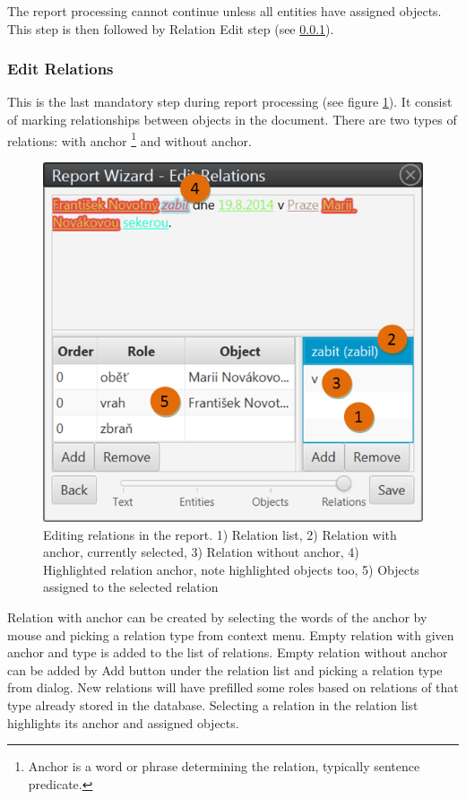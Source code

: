 \documentclass[12pt,a4paper]{report}
\begin{document}
The report processing cannot continue unless all entities have assigned
objects. This step is then followed by Relation Edit step (see
\ref{sssec:EditRelations}).

\subsubsection{Edit Relations}
\label{sssec:EditRelations}

This is the last mandatory step during report processing (see figure
\ref{fig:Relations}). It consist of marking relationships between objects in
the document. There are two types of relations: with anchor%
\footnote{Anchor is a word or phrase determining the relation, typically
sentence predicate.}
and without anchor.

\begin{figure}[!htb]
        \centering
        \includegraphics[width=\textwidth]{Images/relations}
        \caption{Editing relations in the report. 1) Relation list, 2) Relation
		 with anchor, currently selected, 3) Relation without anchor, 4) Highlighted
		 relation anchor, note highlighted objects too, 5) Objects assigned to
		 the selected relation}
        \label{fig:Relations}
\end{figure}

Relation with anchor can be created by selecting the words of the anchor by
mouse and picking a relation type from context menu. Empty relation with given
anchor and type is added to the list of relations. Empty relation without anchor
can be added by Add button under the relation list and picking a relation type
from dialog. New relations will have prefilled some roles based on relations of
that type already stored in the database. Selecting a relation in the relation
list highlights its anchor and assigned objects.
\end{document}
